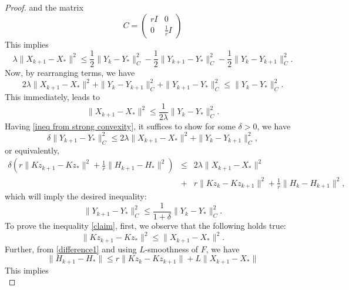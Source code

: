 \begin{itemize}
\begin{proof}
and the matrix 
\begin{equation}
    C = \begin{pmatrix}
r I & 0 \\
0 &  \frac{1}{r} I
\end{pmatrix}
\end{equation}
This implies
\begin{equation}
    \lambda  \| X_{k+1} - X_* \|^2 \leq  \frac{1}{2} \|Y_k -Y_* \|^2_C - \frac{1}{2}  \|Y_{k+1} - Y_* \|^2_C -  \frac{1}{2}  \| Y_k - Y_{k+1}\|^2_C. 
\end{equation}
Now, by rearranging terms, we have 
\begin{equation}\label{ineq from strong convexity}
2\lambda \| X_{k+1} - X_* \|^2 + \| Y_k - Y_{k+1}\|^2_C + \|Y_{k+1} - Y_* \|^2_C \leq  \|Y_k -Y_* \|^2_C.
\end{equation}
This immediately, leads to 
\begin{equation}
\|X_{k+1} - X_* \|^2 \leq \frac{1}{2 \lambda} \|Y_{k} - Y_* \|^2_C.
\end{equation}
Having \eqref{ineq from strong convexity}, it suffices to show for some $\delta > 0$, we have 
\begin{equation}\label{claim}
\delta \|Y_{k+1} - Y_* \|^2_C \leq 2 \lambda \|X_{k+1} - X_* \|^2 + \| Y_k - Y_{k+1}\|^2_C,
\end{equation}
or equivalently,
\begin{eqnarray*}\label{claimequivalence}
\delta \left( r  \|Kz_{k+1}- Kz_{*} \|^2 + \frac{1}{r} \|H_{k+1} - H_{*} \|^2 \right) &\leq&  2 \lambda \|X_{k+1} - X_* \|^2 \\
&+& r \|Kz_{k}- Kz_{k+1} \|^2 + \frac{1}{r} \|H_k - H_{k+1} \|^2, 
\end{eqnarray*}
which will imply the desired inequality: 
\begin{equation}
\|Y_{k+1} - Y_* \|^2_C \leq \frac{1}{1 +\delta} \|Y_{k} - Y_* \|^2_C.
\end{equation}
To prove the inequality \eqref{claim}, first, we observe that the following holds true:   
\begin{equation}\label{bound on z-z*}
\|Kz_{k+1} - Kz_* \|^2 \leq \|X_{k+1} -X_* \|^2.  
\end{equation}
Further, from \eqref{difference1} and using $L$-smoothness of $F$, we have  
\begin{equation}
\|H_{k+1} - H_* \| \leq r \|K z_k - K z_{k+1} \| + L \| X_{k+1} -  X_*\|
\end{equation}
This implies 
\begin{equation}\label{bound on H-H*}

\end{equation}
\end{proof}
\end{itemize}
